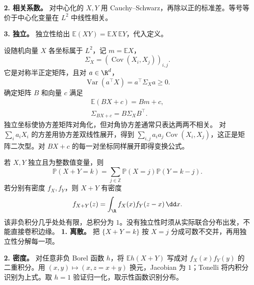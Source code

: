 \textbf{2. 相关系数。} 对中心化的 $X,Y$ 用 Cauchy--Schwarz，再除以正的标准差。等号等价于中心化变量在 $L^2$ 中线性相关。

\textbf{3. 独立。} 独立性给出 $\mathbb E(XY)=\mathbb EX\,\mathbb EY$，代入定义。

设随机向量 $X$ 各坐标属于 $L^2$，记 $m=\mathbb EX$，
\[
\Sigma_X=(\operatorname{Cov}(X_i,X_j))_{i,j}.
\]
它是对称半正定矩阵，且对 $a\in\R^d$，
\[
\operatorname{Var}(a^\top X)=a^\top\Sigma_Xa\ge0.
\]
确定矩阵 $B$ 和向量 $c$ 满足
\[
\begin{gathered}
\mathbb E(BX+c)=Bm+c,\\
\Sigma_{BX+c}=B\Sigma_XB^\top.
\end{gathered}
\]
独立坐标使协方差矩阵对角化，但对角协方差通常只表达两两不相关。
对 $\sum_i a_iX_i$ 的方差用协方差双线性展开，得到 $\sum_{i,j}a_ia_j\operatorname{Cov}(X_i,X_j)$，这正是矩阵二次型。对 $BX+c$ 的每一对坐标同样展开即得变换公式。

若 $X,Y$ 独立且为整数值变量，则
\[
\mathbb P(X+Y=k)=
\sum_{j\in\mathbb Z}\mathbb P(X=j)\mathbb P(Y=k-j).
\]
若分别有密度 $f_X,f_Y$，则 $X+Y$ 有密度
\[
f_{X+Y}(z)=\int_{\R}f_X(x)f_Y(z-x)\,\dd x.
\]
该非负积分几乎处处有限，总积分为 $1$。没有独立性时须从实际联合分布出发，不能直接卷积边缘。
\textbf{1. 离散。} 把 $\{X+Y=k\}$ 按 $X=j$ 分成可数不交并，再用独立性分解每一项。

\textbf{2. 密度。} 对任意非负 Borel 函数 $h$，将 $\mathbb E h(X+Y)$ 写成对 $f_X(x)f_Y(y)$ 的二重积分。用 $(x,y)\mapsto(x,z=x+y)$ 换元，Jacobian 为 $1$；Tonelli 将内积分识别为上式。取 $h=1$ 验证归一化，取示性函数识别分布。
